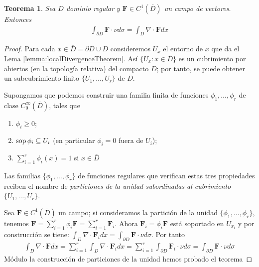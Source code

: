 \documentclass{report}
\newtheorem{theorem}{Teorema}
\theoremstyle{definition}
\theoremstyle{remark}
\DeclareMathOperator{\support}{\textnormal{sop}}
\begin{document}
  \begin{theorem}
    Sea \(D\) dominio regular y \(\mathbf{F} \in C^1\left(\overline{D}\right)\) un campo de vectores.
    Entonces
    \begin{align}
      \int_{\partial D} \mathbf{F} \cdot \nu d \sigma
      =
      \int_D \nabla \cdot \mathbf{F} dx
    \end{align}
  \end{theorem}
  \begin{proof}
    Para cada \(x \in \overline{D} = \partial D \cup D\) consideremos \(U_x\) el entorno de \(x\) que da el Lema \ref{lemma:localDivergenceTheorem}.
    Así \(\{U_x : x \in \overline{D}\}\) es un cubrimiento por abiertos (en la topología relativa) del compacto \(\overline{D}\);
    por tanto, se puede obtener un subcubrimiento finito \(\{U_1, \dots, U_r\}\) de \(\overline{D}\).

    Supongamos que podemos construir una familia finita de funciones \(\phi_1, \dots, \phi_r\) de clase \(C^{\infty}_0(\overline{D})\), tales que
    \begin{enumerate}
      \item \(\phi_i \geq 0\);
      \item \(\support \phi_i \subseteq U_i\) (en particular \(\phi_i = 0\) fuera de \(U_i\));
      \item \(\sum_{i = 1}^r \phi_i(x) = 1\) si \(x \in \overline{D}\)
    \end{enumerate}
    Las familias \(\{\phi_1, \dots, \phi_r\}\) de funciones regulares que verifican estas tres propiedades reciben el nombre de \emph{particiones de la unidad subordinadas al cubrimiento} \(\{U_1, \dots, U_r\}\).

    Sea \(\mathbf{F} \in C^1(\overline{D})\) un campo;
    si consideramos la partición de la unidad \(\{\phi_1, \dots, \phi_r\}\), tenemos
    \(
      \mathbf{F}
      =
      \sum_{i = 1}^r \phi_i \mathbf{F}
      =
      \sum_{i = 1}^r \mathbf{F}_i
    \).
    Ahora \(\mathbf{F}_i = \phi_i \mathbf{F}\) está soportado en \(U_{x_i}\) y por construcción se tiene:
    \(
      \int_D \nabla \cdot \mathbf{F}_i dx
      =
      \int_{\partial D} \mathbf{F} \cdot \nu d \sigma
    \).
    Por tanto
    \begin{align}
      \int_D \nabla \cdot \mathbf{F} dx
      =
      \sum_{i = 1}^r \int_D \nabla \cdot \mathbf{F}_i dx
      =
      \sum_{i = 1}^r \int_{\partial D} \mathbf{F}_i \cdot \nu d \sigma
      =
      \int_{\partial D} \mathbf{F} \cdot \nu d \sigma
    \end{align}
    Módulo la construcción de particiones de la unidad hemos probado el teorema
  \end{proof}
\end{document}
